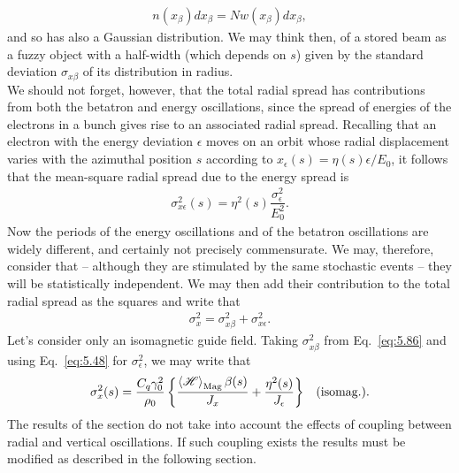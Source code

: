 \begin{align*}
	n(x_\beta)dx_\beta = Nw(x_\beta)dx_\beta,
\end{align*}
and so has also a Gaussian distribution. We may think then, of a stored beam as a fuzzy object with a half-width (which depends on $s$) given by the standard deviation $\sigma_{x\beta}$ of its distribution in radius.\\
We should not forget, however, that the total radial spread has contributions from both the betatron and energy oscillations, since the spread of energies of the electrons in a bunch gives rise to an associated radial spread. Recalling that an electron with the energy deviation $\epsilon$ moves on an orbit whose radial displacement varies with the azimuthal position $s$ according to $x_\epsilon(s) = \eta(s) \epsilon/E_0$, it follows that the mean-square radial spread due to the energy spread is
\begin{align}
	\sigma_{x\epsilon}^2(s) = \eta^2(s) \dfrac{\sigma_\epsilon^2}{E_0^2}.
\end{align}
Now the periods of the energy oscillations and of the betatron oscillations are widely different, and certainly not precisely commensurate. We may, therefore, consider that -- although they are stimulated by the same stochastic events -- they will be statistically independent. We may then add their contribution to the total
radial spread as the squares and write that
\begin{align}
	\sigma_x^2 = \sigma_{x\beta}^2 + \sigma_{x\epsilon}^2.
\end{align}
Let's consider only an isomagnetic guide field. Taking $\sigma_{x\beta}^2$ from Eq.~\eqref{eq:5.86} and using Eq.~\eqref{eq:5.48} for $\sigma_\epsilon^2$, we may write that
\begin{align}
	\sigma_x^2(s) = \dfrac{C_q\gamma_0^2}{\rho_0} \left\lbrace \dfrac{\left< \mathscr{H} \right>_\text{Mag} \beta(s)}{J_x} + \dfrac{\eta^2(s)}{J_\epsilon} \right\rbrace && \text{(isomag.)}.
\end{align}
The results of the section do not take into account the effects of coupling between radial and vertical oscillations. If such coupling exists the results must be modified as described in the following section.
